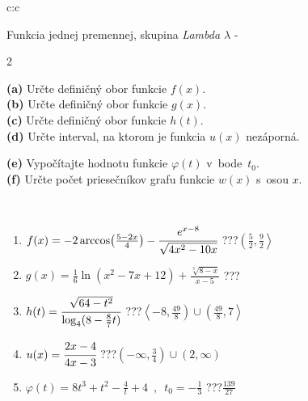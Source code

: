 \documentclass[10pt]{report}
\begin{document}
\begin{tabular}{c:c}
\begin{minipage}[c][104.5mm][t]{0.5\linewidth}
\begin{center}
\vspace{7mm}
{\huge Funkcia jednej premennej, skupina \textit{Lambda $\lambda$} -}\\[5mm]
\begin{minipage}{0.95\linewidth}
\begin{center}
{\small \begin{multicols}{2} \raggedright
\textbf{(a)} Určte definičný obor funkcie \(f(x)\). \\[1mm]
\textbf{(b)} Určte definičný obor funkcie \(g(x)\). \\[1mm]
\textbf{(c)} Určte definičný obor funkcie \(h(t)\). \\[1mm]
\textbf{(d)} Určte interval, na ktorom je funkcia \(u(x)\) nezáporná. \par \columnbreak
\textbf{(e)} Vypočítajte hodnotu funkcie \(\varphi(t)\) v~bode~\(t_0\). \\[1mm]
\textbf{(f)} Určte počet priesečníkov grafu funkcie \(w(x)\) s~osou \(x\). \\[1mm]
\end{multicols}
}
\end{center}
\end{minipage}
\\[4mm]
\begin{minipage}{0.79\linewidth}
\begin{center}
\begin{varwidth}{\linewidth}
\begin{enumerate}
\small
\item $f(x) = -2\arccos\!\left( \frac{5-2x}{4} \right) - \cfrac{e^{x-8}}{\sqrt{4x^2-10x}}$\quad \dotfill\; ???\;\dotfill \quad $\left(\frac{5}{2} , \frac{9}{2}\right\rangle$
\item $g(x) = \frac{1}{6} \ln{\!(x^2-7x+12)}+\frac{\sqrt[3]{8-x}}{x-5}$\quad \dotfill\; ???\;\dotfill {}
\item $h(t) = \cfrac{\sqrt{64-t^2}}{\log_4(8-\frac{8}{7}t)}$\quad \dotfill\; ???\;\dotfill \quad $\left\langle-8 , \frac{49}{8}\right)\cup\left(\frac{49}{8} , 7\right\rangle$
\item $u(x) = \cfrac{2x-4}{4x-3}$\quad \dotfill\; ???\;\dotfill \quad $\left(-\infty , \frac{3}{4}\right)\cup\left(2 , \infty\right)$
\item $\varphi(t) = 8t^3+t^2-\frac{4}{t}+4 \enspace , \enspace t_0=-\frac{1}{3}$\quad \dotfill\; ???\;\dotfill \quad $\frac{139}{27}$

\end{enumerate}
\end{varwidth}
\end{center}
\end{minipage}
\end{center}
\end{minipage}
\end{tabular}
\end{document}
